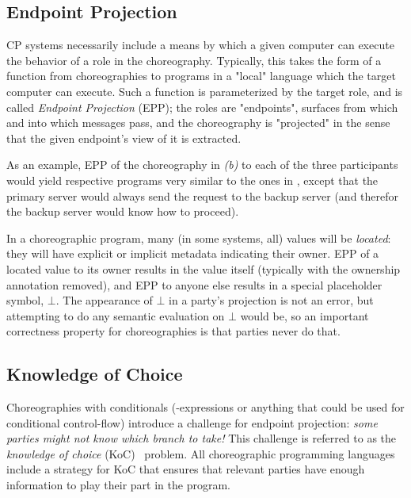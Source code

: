 \subsection{Endpoint Projection}
\label{sec:endpoint-projection}
CP systems necessarily include a means by which a given computer can execute the behavior of a role in the choreography.
Typically, this takes the form of a function from choreographies to programs in a "local" language
which the target computer can execute.
Such a function is parameterized by the target role, and is called \emph{Endpoint Projection} (EPP);
the roles are "endpoints", \ie surfaces from which and into which messages pass,
and the choreography is "projected" in the sense that the given endpoint's view of it is extracted.

As an example, EPP of the choreography in \emph{(b)} to each of the three participants
would yield respective programs very similar to the ones in ,
except that the primary server would always send the request to the backup server
(and therefor the backup server would know how to proceed).

In a choreographic program, many (in some systems, all) values will be \emph{located}:
they will have explicit or implicit metadata indicating their owner.
EPP of a located value to its owner results in the value itself
(typically with the ownership annotation removed),
and EPP to anyone else results in a special placeholder symbol, \eg $\bot$.
The appearance of $\bot$ in a party's projection is not an error,
but attempting to do any semantic evaluation on $\bot$ would be,
so an important correctness property for choreographies is that parties never do that.

\subsection{Knowledge of Choice}
\label{sec:knowledge-of-choice}

Choreographies with conditionals
(-expressions or anything that could be used for conditional control-flow)
introduce
a challenge for endpoint projection:
\emph{some parties might not know which branch to take!}
This challenge is referred to as the \emph{knowledge of choice}  (KoC)~\cite{castagna-knowledge-of-choice} problem.
All choreographic programming languages include a strategy for KoC
that ensures that relevant parties have enough information to play their part in the program.

